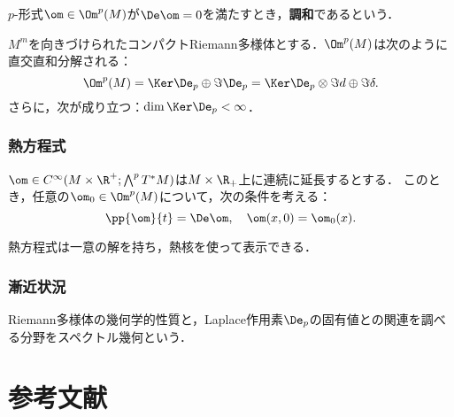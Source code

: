 \documentclass[uplatex,dvipdfmx]{jsreport}
\begin{document}
\begin{definition}
    $p$-形式$\om\in\Om^p(M)$が$\De\om=0$を満たすとき，\textbf{調和}であるという．
\end{definition}

\begin{theorem}[Hodge-小平]
    $M^m$を向きづけられたコンパクトRiemann多様体とする．$\Om^p(M)$は次のように直交直和分解される：
    \[\Om^p(M)=\Ker\De_p\oplus\Im\De_p=\Ker\De_p\otimes\Im d\oplus\Im\delta.\]
    さらに，次が成り立つ：$\dim\Ker\De_p<\infty$．
\end{theorem}

\subsection{熱方程式}

\begin{definition}
    $\om\in C^\infty(M\times\R^+;\bigwedge^pT^*M)$は$M\times\R_+$上に連続に延長するとする．
    このとき，任意の$\om_0\in\Om^p(M)$について，次の条件を考える：
    \[\pp{\om}{t}=\De\om,\quad\om(x,0)=\om_0(x).\]
\end{definition}

\begin{theorem}
    熱方程式は一意の解を持ち，熱核を使って表示できる．
\end{theorem}

\subsection{漸近状況}

\begin{tcolorbox}[colframe=ForestGreen, colback=ForestGreen!10!white,breakable,colbacktitle=ForestGreen!40!white,coltitle=black,fonttitle=\bfseries\sffamily,
title=]
    Riemann多様体の幾何学的性質と，Laplace作用素$\De_p$の固有値との関連を調べる分野をスペクトル幾何という．
\end{tcolorbox}

\chapter{参考文献}

\cite{小松ベクトル解析I}
\cite{小松ベクトル解析II}
\cite{佐々木}


\end{document}
